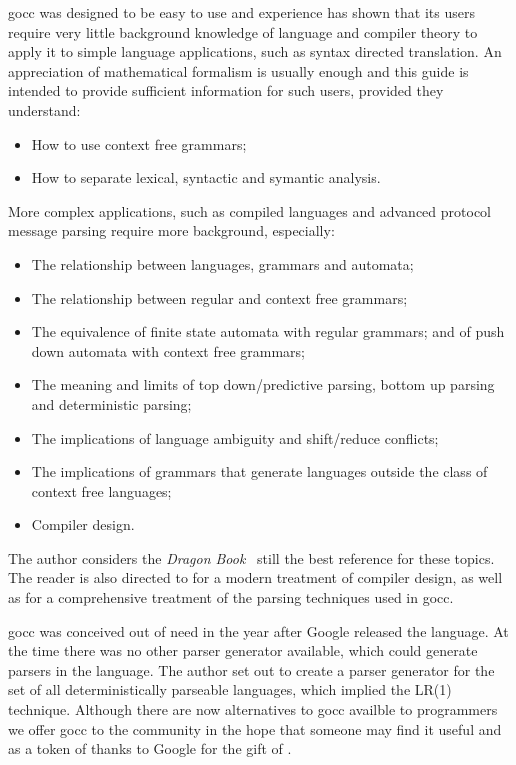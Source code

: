 \documentclass[12pt]{article}
\begin{document}
	gocc was designed to be easy to use and experience has shown that its users require very little background knowledge of language and compiler theory to apply it to simple language applications, such as syntax directed translation. An appreciation of mathematical formalism is usually enough and this guide is intended to provide sufficient information for such users, provided they understand:
	\begin{itemize}
		\item How to use context free grammars;
		\item How to separate lexical, syntactic and symantic analysis.
	\end{itemize}

	More complex applications, such as compiled languages and advanced protocol message parsing require more background, especially:
	\begin{itemize}
		\item The relationship between languages, grammars and automata;
		\item The relationship between regular and context free grammars;
		\item The equivalence of finite state automata with regular grammars; and of push down automata with context free grammars;
		\item The meaning and limits of top down/predictive parsing, bottom up parsing and deterministic parsing;
		\item The implications of language ambiguity and shift/reduce conflicts;
		\item The implications of grammars that generate languages outside the class of context free languages;
		\item Compiler design.
	\end{itemize}

	The author  considers the {\em Dragon Book}~\cite{Dragon Book} still the best reference for these topics. The reader is also directed to \cite{Modern Compiler Design} for a modern treatment of compiler design, as well as \cite{Parsing} for a comprehensive treatment of the parsing techniques used in gocc.

	gocc was conceived out of need in the year after Google released the \Go language. At the time there was no other parser generator available, which could generate parsers in the \Go language. The author set out to create a parser generator for the set of all deterministically parseable languages, which implied the LR(1) technique. Although there are now alternatives to gocc availble to \Go programmers we offer gocc to the community in the hope that someone may find it useful and as a token of thanks to Google for the gift of \Go.
\end{document}
